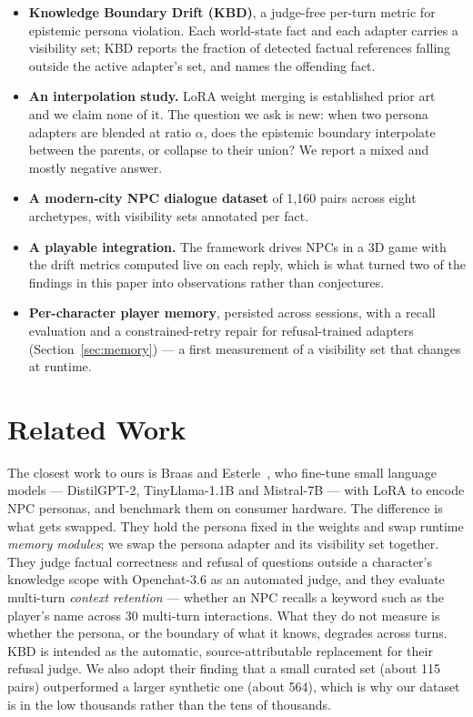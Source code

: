 \documentclass[conference]{IEEEtran}
\begin{document}
\begin{itemize}
  \item \textbf{Knowledge Boundary Drift (KBD)}, a judge-free per-turn metric
        for epistemic persona violation. Each world-state fact and each adapter
        carries a visibility set; KBD reports the fraction of detected factual
        references falling outside the active adapter's set, and names the
        offending fact.
  \item \textbf{An interpolation study.} LoRA weight merging is established
        prior art~\cite{wang2025fusion} and we claim none of it. The question we
        ask is new: when two persona adapters are blended at ratio $\alpha$,
        does the epistemic boundary interpolate between the parents, or collapse
        to their union? We report a mixed and mostly negative answer.
  \item \textbf{A modern-city NPC dialogue dataset} of 1{,}160 pairs across
        eight archetypes, with visibility sets annotated per fact.
  \item \textbf{A playable integration.} The framework drives NPCs in a 3D
        game with the drift metrics computed live on each reply, which is what
        turned two of the findings in this paper into observations rather than
        conjectures.
  \item \textbf{Per-character player memory}, persisted across sessions, with
        a recall evaluation and a constrained-retry repair for refusal-trained
        adapters (Section~\ref{sec:memory}) --- a first measurement of a
        visibility set that changes at runtime.
\end{itemize}

\section{Related Work}

The closest work to ours is Braas and Esterle~\cite{braas2025fixed}, who
fine-tune small language models --- DistilGPT-2, TinyLlama-1.1B and
Mistral-7B --- with LoRA to encode NPC personas, and benchmark them on consumer
hardware. The difference is what gets swapped. They hold the persona fixed in
the weights and swap runtime \emph{memory modules}; we swap the persona adapter
and its visibility set together. They judge factual correctness and refusal of
questions outside a character's knowledge scope with Openchat-3.6 as an
automated judge, and they evaluate multi-turn \emph{context retention} --- whether
an NPC recalls a keyword such as the player's name across 30 multi-turn
interactions. What they do not measure is whether the persona, or the boundary
of what it knows, degrades across turns. KBD is intended as the automatic,
source-attributable replacement for their refusal judge. We also adopt their
finding that a small curated set (about 115 pairs) outperformed a larger
synthetic one (about 564), which is why our dataset is in the low thousands
rather than the tens of thousands.
\end{document}
